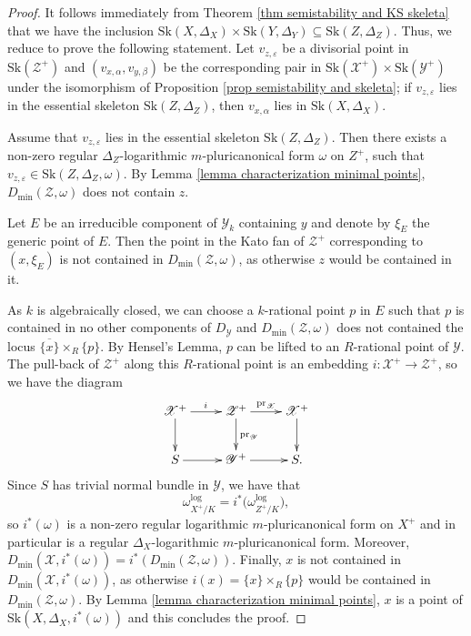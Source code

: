 \documentclass{amsart}%
\numberwithin{equation}{subsection}
\theoremstyle{plain2}
\theoremstyle{definition2}
\theoremstyle{stepstyle}
\theoremstyle{point}
\theoremstyle{subpoint}
\newcommand{\cX}{\ensuremath{\mathscr{X}}}
\newcommand{\cY}{\ensuremath{\mathscr{Y}}}
\newcommand{\cZ}{\ensuremath{\mathscr{Z}}}
\renewcommand{\cZ}{\ensuremath{\mathscr{Z}}}
\renewcommand{\cY}{\ensuremath{\mathscr{Y}}}
\newcommand{\pr}{\mathrm{pr}}
\newcommand{\Sk}{\mathrm{Sk}}
\begin{document}
\begin{proof}
It follows immediately from Theorem \ref{thm semistability and KS skeleta} that we have the inclusion $ \Sk(X,\Delta_X) \times \Sk(Y,\Delta_Y) \subseteq \Sk(Z,\Delta_Z)$. Thus, we reduce to prove the following statement. Let $v_{z,\varepsilon}$ be a divisorial point in $\Sk(\cZ^+)$ and $(v_{x,\alpha},v_{y,\beta})$ be the corresponding pair in $\Sk(\cX^+) \times \Sk(\cY^+)$ under the isomorphism of Proposition \ref{prop semistability and skeleta}; if $v_{z,\varepsilon}$ lies in the essential skeleton $\Sk(Z,\Delta_Z)$, then $v_{x,\alpha}$ lies in $\Sk(X,\Delta_X)$.

Assume that $v_{z,\varepsilon}$ lies in the essential skeleton $\Sk(Z,\Delta_Z)$. Then there exists a non-zero regular $\Delta_Z$-logarithmic $m$-pluricanonical form $\omega$ on $Z^+$, such that $v_{z,\varepsilon} \in \Sk(Z,\Delta_Z, \omega)$. By Lemma \ref{lemma characterization minimal points}, $D_{\min}(\cZ,\omega)$ does not contain $z$.

Let $E$ be an irreducible component of $\cY_k$ containing $y$ and denote by $\xi_E$ the generic point of $E$. Then the point in the Kato fan of $\cZ^+$ corresponding to $(x,\xi_E)$ is not contained in $D_{\min}(\cZ,\omega)$, as otherwise $z$ would be contained in it.

As $k$ is algebraically closed, we can choose a $k$-rational point $p$ in $E$ such that $p$ is contained in no other components of $D_\cY$ and $D_{\min}(\cZ,\omega)$ does not contained the locus $\overline{\{x\}} \times_R \{p\}$. By Hensel's Lemma, $p$ can be lifted to an $R$-rational point of $\cY$. The pull-back of $\cZ^+$ along this $R$-rational point is an embedding $i: \cX^+ \rightarrow \cZ^+$, so we have the diagram
\[
\xymatrix{ \cX^+ \ar[r]^i\ar[d] & \cZ^+ \ar[r]^{\pr_\cX}\ar[d]^{\pr_\cY} & \cX^+ \ar[d] \\
S \ar[r] & \cY^+\ar[r] & S.
}
\] Since $S$ has trivial normal bundle in $\cY$, we  have that $$\omega_{X^+/K}^{\log} = i^*\big(\omega_{Z^+/K}^{\log}\big),$$ so $i^*(\omega)$ is a non-zero regular logarithmic $m$-pluricanonical form on $X^+$ and in particular is a regular $\Delta_X$-logarithmic $m$-pluricanonical form. Moreover, $D_{\min}(\cX,i^*(\omega)) = i^*(D_{\min}(\cZ,\omega))$. Finally, $x$ is not contained in $D_{\min}(\cX, i^*(\omega))$, as otherwise $i(x)= \{x\} \times_R \{p\}$ would be contained in $D_{\min}(\cZ,\omega)$. By Lemma \ref{lemma characterization minimal points}, $x$ is a point of $\Sk(X,\Delta_X, i^*(\omega))$ and this concludes the proof.
\end{proof}
\end{document}

